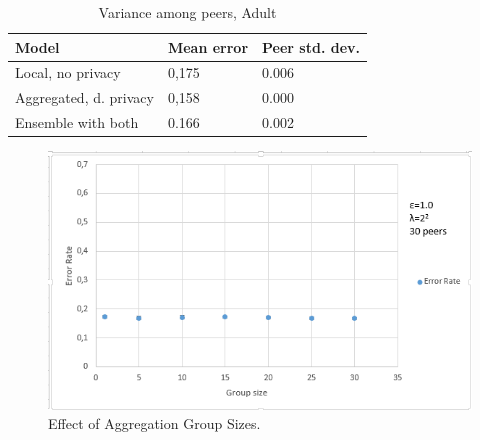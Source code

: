 \begin{table}[h]
	\centering
	\caption{Variance among peers, Adult}
	\label{table:peer_variance_adult}
	\begin{tabular}{|l|l|l|}
		\textbf{Model}                  & \textbf{Mean error} & \textbf{Peer std. dev.} \\
		\hline
		Local, no privacy      & 0,175 & 0.006 \\
		Aggregated, d. privacy & 0,158 & 0.000	 \\
		Ensemble with both & 0.166 & 0.002 \\
	\end{tabular}
\end{table}      

\begin{figure}[h]
	\centering
	\includegraphics[width=\textwidth]{fig/adult/GroupSizeTest}
	\caption{Effect of Aggregation Group Sizes.}
	\label{fig:results_group_sizes}
\end{figure}






\cleardoublepage
